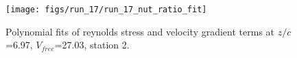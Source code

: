 \begin{figure}[H]
\centering
\texttt{[image: figs/run\_17/run\_17\_nut\_ratio\_fit]}
\caption{Polynomial fits of reynolds stress and velocity gradient terms at $z/c$=6.97, $V_{free}$=27.03, station 2.}
\label{fig:run_17_nut_ratio_fit}
\end{figure}


